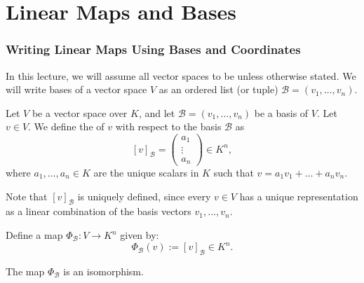
\setcounter{chapter}{15} %

\chapter{Linear Maps and Bases}

\subsection{Writing Linear Maps Using Bases and Coordinates}

\renewcommand{\thetheorem}{\thechapter.\arabic{theorem}}

In this lecture, we will assume all vector spaces to be  unless otherwise stated. We will write bases of a vector space $V$ as an ordered list (or tuple) $\mathcal{B} = (v_1, \dots, v_n)$.

\begin{definition}
\label{def:coordinate_vector}
Let $V$ be a vector space over $K$, and let $\mathcal{B} = (v_1, \dots, v_n)$ be a basis of $V$. Let $v \in V$. We define the  of $v$ with respect to the basis $\mathcal{B}$ as
\[
[v]_{\mathcal{B}} = 
\begin{pmatrix}
a_1 \\
\vdots \\
a_n
\end{pmatrix}
\in K^n,
\]
where $a_1, \dots, a_n \in K$ are the unique scalars in $K$ such that $v = a_1 v_1 + \dots + a_n v_n$.
\end{definition}

\begin{remark}
Note that $[v]_{\mathcal{B}}$ is uniquely defined, since every $v \in V$ has a unique representation as a linear combination of the basis vectors $v_1, \dots, v_n$.
\end{remark}

Define a map $\Phi_{\mathcal{B}}: V \to K^n$ given by:
\[
\Phi_{\mathcal{B}}(v) := [v]_{\mathcal{B}} \in K^n.
\]

\begin{proposition}
\label{prop:coordinate_map_isomorphism}
The map $\Phi_{\mathcal{B}}$ is an isomorphism.
\end{proposition}

